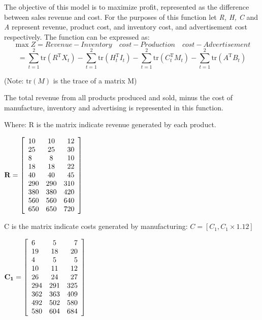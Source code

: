 \documentclass[12pt]{article}
\begin{document}
The objective of this model is to maximize profit, represented as the difference between sales revenue and cost.  For the purposes of this function let \textit{R, H, C} and \textit{A} represent revenue, product cost, and inventory cost, and advertisement cost respectively.  The function can be expressed as:
$$\max Z = Revenue-Inventory \quad cost-Production \quad cost-Advertisement$$
\begin{equation}
=
\sum\limits_{t=1}^2{\mathrm {tr}(R ^ \mathrm{ T }X_t)}
- \sum\limits_{t=1}^2 {\mathrm {tr}(H_t ^ \mathrm{ T }I_t)} 
- \sum\limits_{t=1}^2 {\mathrm {tr}(C_t ^ \mathrm{ T }M_t)}
- \sum\limits_{t=1}^2 {\mathrm {tr}(A ^ \mathrm{ T }B_t)}
\end{equation}



(Note: $\mathrm {tr}(M)$ is the trace of a matrix M)

The total revenue from all products produced and sold, minus the cost of manufacture, inventory and advertising is represented in this function. 

\noindent
Where: R is the matrix indicate revenue generated by each product.
\begin{center}
$\mathbf{R} =  
\left[
\begin{array}{l c r}
10 &10 & 12  \\
25 &25 & 30  \\
8  &8  & 10  \\
18 &18 & 22  \\
40 &40 & 45  \\
290&290&  310  \\
380&380&  420  \\
560&560&  640  \\
650&650&  720  
\end{array}
\right]
$
\end{center}
\noindent
C is the matrix indicate costs generated by manufacturing:
$C= \left[C_1,C_1\times1.12\right]$

\begin{center}
$\mathbf{C_1} = 
\left[
\begin{array}{l c r}
6  & 5 & 7  \\
19 & 18& 20 \\
4  & 5 & 5  \\
10 & 11& 12 \\
26 & 24& 27 \\
294 &291 &325 \\
362 &363 &409 \\
492 &502 &580 \\
580 &604 &684 
\end{array}
\right]
$
\end{center}
\end{document}
